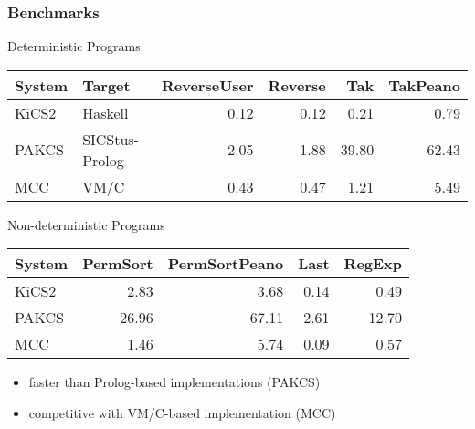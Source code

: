 \documentclass[10pt]{beamer}
\begin{document}
\begin{frame}
\frametitle{Benchmarks {\lgrey [WFLP'11]}}

\begin{block}{Deterministic Programs}
\begin{center}
\begin{tabular}{|@{~~}l@{~~}|l@{~~}|*{4}{@{~~}r@{~~}|}}
\hline
System  & Target   & ReverseUser & Reverse &  Tak  & TakPeano \\\hline
KiCS2   & Haskell  &      0.12   &   0.12  &  0.21 &    0.79  \\[0.5ex]
PAKCS   & SICStus-Prolog    &      2.05   &   1.88  & 39.80 &   62.43  \\[0.5ex]
MCC     & VM/C     &      0.43   &   0.47  &  1.21 &    5.49  \\[0.5ex]
\hline
\end{tabular}
\end{center}
\end{block}
\vfill

\begin{block}{Non-deterministic Programs}
\begin{center}
\begin{tabular}{|@{~~}l@{~~}|*{4}{@{~~}r@{~~}|}}
\hline
System  & PermSort & PermSortPeano &  Last & RegExp \\\hline
KiCS2   &    2.83  &        3.68   &  0.14 &   0.49 \\[0.5ex]
PAKCS   &   26.96  &       67.11   &  2.61 &  12.70 \\[0.5ex]
MCC     &    1.46  &        5.74   &  0.09 &   0.57 \\[0.5ex]
\hline
\end{tabular}
\end{center}
\end{block}
\vfill
\begin{block}{}
  \begin{itemize}
  \item faster than Prolog-based implementations (PAKCS)
  \item competitive with VM/C-based implementation (MCC)
  \end{itemize}
\end{block}
\end{frame}
\end{document}
